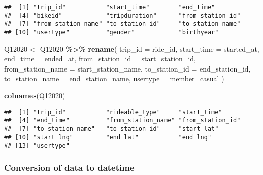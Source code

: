 \documentclass[
]{article}
\newenvironment{Shaded}{\begin{snugshade}}{\end{snugshade}}
\newcommand{\AttributeTok}[1]{\textcolor[rgb]{0.13,0.29,0.53}{#1}}
\newcommand{\CommentTok}[1]{\textcolor[rgb]{0.56,0.35,0.01}{\textit{#1}}}
\newcommand{\FunctionTok}[1]{\textcolor[rgb]{0.13,0.29,0.53}{\textbf{#1}}}
\newcommand{\NormalTok}[1]{#1}
\newcommand{\OtherTok}[1]{\textcolor[rgb]{0.56,0.35,0.01}{#1}}
\newcommand{\SpecialCharTok}[1]{\textcolor[rgb]{0.81,0.36,0.00}{\textbf{#1}}}
\begin{document}
\begin{verbatim}
##  [1] "trip_id"           "start_time"        "end_time"         
##  [4] "bikeid"            "tripduration"      "from_station_id"  
##  [7] "from_station_name" "to_station_id"     "to_station_name"  
## [10] "usertype"          "gender"            "birthyear"
\end{verbatim}

\begin{Shaded}
\begin{Highlighting}[]
\NormalTok{Q12020 }\OtherTok{\textless{}{-}}\NormalTok{ Q12020 }\SpecialCharTok{\%\textgreater{}\%} 
  \FunctionTok{rename}\NormalTok{(}
    \AttributeTok{trip\_id =}\NormalTok{ ride\_id,}
    \AttributeTok{start\_time =}\NormalTok{ started\_at,}
    \AttributeTok{end\_time =}\NormalTok{ ended\_at,}
    \AttributeTok{from\_station\_id =}\NormalTok{ start\_station\_id,}
    \AttributeTok{from\_station\_name =}\NormalTok{ start\_station\_name,}
    \AttributeTok{to\_station\_id =}\NormalTok{ end\_station\_id,}
    \AttributeTok{to\_station\_name =}\NormalTok{ end\_station\_name,}
    \AttributeTok{usertype =}\NormalTok{ member\_casual}
\NormalTok{    )}
\end{Highlighting}
\end{Shaded}

\begin{Shaded}
\begin{Highlighting}[]
\FunctionTok{colnames}\NormalTok{(Q12020)}
\end{Highlighting}
\end{Shaded}

\begin{verbatim}
##  [1] "trip_id"           "rideable_type"     "start_time"       
##  [4] "end_time"          "from_station_name" "from_station_id"  
##  [7] "to_station_name"   "to_station_id"     "start_lat"        
## [10] "start_lng"         "end_lat"           "end_lng"          
## [13] "usertype"
\end{verbatim}

\hypertarget{conversion-of-data-to-datetime}{%
\subsubsection{Conversion of data to
datetime}\label{conversion-of-data-to-datetime}}

\begin{Shaded}
\end{Shaded}
\end{document}
